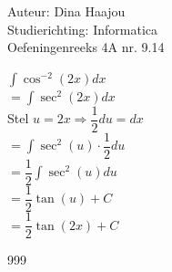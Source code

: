 \documentclass[a4paper]{article}
\begin{document}
   
  
\noindent \large Auteur: Dina Haajou \\
\noindent \large Studierichting: Informatica\\
\noindent \large Oefeningenreeks 4A nr. 9.14\\

\medskip

\normalsize

$ \displaystyle\int \cos^{-2}(2x) dx $ \\

$ = \displaystyle\int \sec^2(2x) dx $ \\

Stel $u = 2x \Rightarrow \dfrac{1}{2}du = dx$ \\

$ = \displaystyle\int \sec^2(u) \cdot \dfrac{1}{2} du $ \\

$ = \dfrac{1}{2} \displaystyle\int \sec^2(u) du $ \\

$ = \dfrac{1}{2} \tan(u) + C $ \\

$ = \dfrac{1}{2} \tan(2x) + C $

\begin{thebibliography}{999}
\end{thebibliography}
\end{document}
